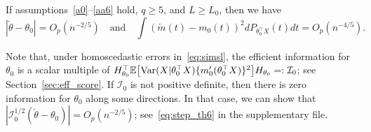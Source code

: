  \begin{thm}\label{thm:ratestCLSE}
If assumptions~\ref{a0}--\ref{aa6} hold, $q\ge 5$, and $L\ge L_0$, then we have 
\[
|\check{\theta} - \theta_0| = O_p(n^{-2/5}) \quad \text{and} \quad  {\int (\check{m}(t)- m_0 (t))^2 dP_{\theta_0^{\top}X}(t) dt = O_p(n^{-4/5})}.\]
\end{thm}
\begin{remark}\label{rem:SingularInformation}
Note that, under homoscedastic errors in~\eqref{eq:simsl}, the efficient information for $\theta_0$ is a scalar multiple of $H_{\theta_0}^\top\mathbb{E}\big[\mathrm{Var}(X|\theta_0^\top X) \{m_0'(\theta_0^{\top}X)\}^2 \big]H_{\theta_0}=: \mathcal{I}_0$; see Section~\ref{sec:eff_score}. If $\mathcal{I}_0$ is  not positive definite, then there is zero information for $\theta_0$ along some directions. In that case, we can show that $| \mathcal{I}_0^{1/2} (\check{\theta} - \theta_0)| = O_p(n^{-2/5})$; see~\eqref{eq:step_th6} in the supplementary file. 
\end{remark}

